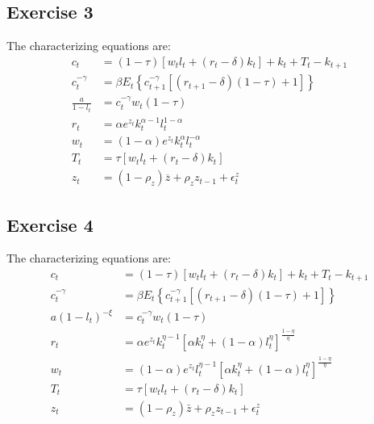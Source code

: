 \documentclass[UTF8]{article}
\begin{document}
\subsection*{Exercise 3}
The characterizing equations are:
\begin{align*}
c_{t}&=(1-\tau)\left[w_{t} l_{t}+\left(r_{t}-\delta\right) k_{t}\right]+k_{t}+T_{t}-k_{t+1} \\
c_{t}^{-\gamma}&=\beta E_t\left\{c_{t+1}^{-\gamma}\left[\left(r_{t+1}-\delta\right)(1-\tau)+1\right]\right\} \\
\frac{a}{1-l_{t}}&=c_{t}^{-\gamma} w_{t}(1-\tau) \\
r_{t}&=\alpha e^{z_{t}} k_{t}^{\alpha-1} l_{t}^{1-\alpha} \\
w_{t}&=(1-\alpha)e^{z_{t}} k_{t}^{\alpha} l_{t}^{-\alpha} \\
T_t &= \tau\left[w_{t} l_{t}+\left(r_{t}-\delta\right) k_{t}\right] \\
z_{t}&=\left(1-\rho_{z}\right) \overline{z}+\rho_{z} z_{t-1}+\epsilon_{t}^{z}
\end{align*}

\subsection*{Exercise 4}
The characterizing equations are:
\begin{align*}
c_{t}&=(1-\tau)\left[w_{t} l_{t}+\left(r_{t}-\delta\right) k_{t}\right]+k_{t}+T_{t}-k_{t+1} \\
c_{t}^{-\gamma}&=\beta E_{t}\left\{c_{t+1}^{-\gamma}\left[\left(r_{t+1}-\delta\right)(1-\tau)+1\right]\right\} \\
a\left(1-l_{t}\right)^{-\xi}&=c_{t}^{-\gamma} w_{t}(1-\tau) \\
r_t &= \alpha e^{z_t} k_t^{\eta - 1} [\alpha k_t^{\eta} + (1 - \alpha) l_t^{\eta}]^{\frac{1 - \eta}{\eta}} \\
w_t &= (1 - \alpha) e^{z_t} l_t^{\eta - 1} [\alpha k_t^{\eta} + (1 - \alpha) l_t^{\eta}]^{\frac{1 - \eta}{\eta}} \\
	 T_t &= \tau[w_tl_t + (r_t - \delta)k_t] \\
	z_t &= (1-\rho_z)\bar{z} + \rho_z z_{t-1} + \epsilon^z_t
\end{align*}
\end{document}
